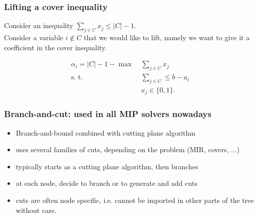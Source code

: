 \documentclass[9pt,handout]{beamer}
\begin{document}
\begin{frame}
\frametitle{Lifting a cover inequality}
Consider an inequality $\sum_{j\in C} x_j \leq |C|-1.$\\
Consider a \alert{variable} $i\not\in C$ that we would like to \alert{lift},
namely we want to give it a coefficient in the \alert{cover inequality}.
\bigskip

\begin{align*}
\alpha_i = |C|-1 - \max\; & \sum_{j\in C} x_j\\
\text{s. t. }\; & \sum_{j\in C} \leq b - a_i\\
& x_j\in \{0,1\}.
\end{align*}
\end{frame}
\begin{frame} \frametitle{Branch-and-cut: used in all MIP solvers nowadays}
  \begin{itemize}
  \item Branch-and-bound combined with cutting plane algorithm
  \item uses several families of cuts, depending on the problem (MIR, covers, ...)
  \item typically starts as a cutting plane algorithm, then branches
  \item at each node, decide to branch or to generate and add cuts
  \item cuts are often node specific, i.e. cannot be imported in other parts of the tree without care.
  \end{itemize}
\end{frame}
\end{document}
